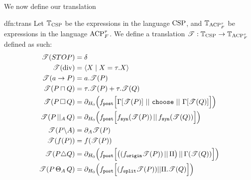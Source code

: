 \documentclass[../hons_project.tex]{subfiles}
\begin{document}
We now define our translation

\begin{dfn}{dfn:trans}{}
	Let $\mathbb{T}_{\mathrm{CSP}}$ be the expressions in the language $\mathrm{CSP}$, and $\mathbb{T}_{\mathrm{ACP}_{F}^{\tau}}$ be expressions in the language $\mathrm{ACP}_{F}^{\tau}$. We define a translation $\mathscr{T} : \mathbb{T}_{\mathrm{CSP}} \to \mathbb{T}_{\mathrm{ACP}_{F}^{\tau}}$ defined as such:
	\begin{align*}
		\mathscr{T}(STOP)           & = \delta                                                                                                                        \\
		\mathscr{T}(\mathrm{div})   & = \langle X \mid X = \tau.X \rangle                                                                                             \\
		\mathscr{T}(a \to P)        & = a.\mathscr{T}(P)                                                                                                                   \\
		\mathscr{T}(P \sqcap Q) & = \tau.\mathscr{T}(P) + \tau.\mathscr{T}(Q)                                                                                               \\
		\mathscr{T}(P \,\square\, Q) & = \partial_{H_{0}}\Bigl(f_{\mathtt{post}}\Bigl[\Gamma[\mathscr{T}(P)]\, \,\vert\vert\, \,\mathtt{choose}\, \,\vert\vert\, \,\Gamma[\mathscr{T}(Q)]\Bigl]\Bigr)  \\
		\mathscr{T}(P \,\vert\vert_{A}\, Q)     & = \partial_{H_{0}}\Bigl(f_{\mathtt{post}}\Bigl[f_{\mathtt{syn}}(\mathscr{T}(P)) \,\vert\vert\, f_{\mathtt{syn}}(\mathscr{T}(Q))\Bigr]\Bigr)                         \\
		\mathscr{T}(P \backslash A) & = \partial_{A}{\mathscr{T}(P)}                                                                                                       \\
		\mathscr{T}(f(P))           & = f(\mathscr{T}(P))                                                                                                                  \\
		\mathscr{T}(P \triangle Q)  & = \partial_{H_{0}}\Bigl(f_{\mathtt{post}}\Bigl[ \bigl((f_{\mathtt{origin}}\mathscr{T}(P)) \,\vert\vert\, \Pi\bigr) \,\vert\vert\, \Gamma(\mathscr{T}(Q)) \Bigr]\Bigr) \\
		\mathscr{T}(P \,\Theta_{A}\, Q) & = \partial_{H_{0}}\Bigl(f_{\mathtt{post}} \Bigl[ (f_{\mathtt{split}} \mathscr{T}(P)) | | \Pi.\mathscr{T}(Q) \Bigr]\Bigr)
	\end{align*}
\end{dfn}
\end{document}
